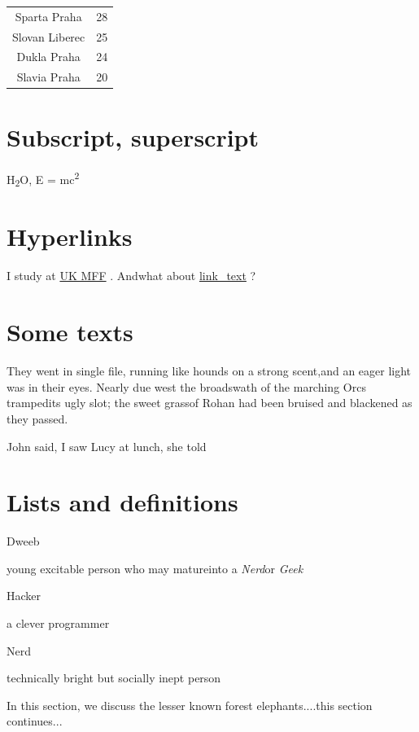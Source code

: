 \documentclass{article}
\begin{document}
\newline

\begin{tabular}{ cc }

 Sparta Praha & 28 \\ 

 Slovan Liberec & 25 \\ 

 Dukla Praha & 24 \\ 

 Slavia Praha & 20 \\ 



\end{tabular}

\section{Subscript, superscript}
\par H\textsubscript{2}O, E = mc\textsuperscript{2}
\section{Hyperlinks}
\par I study at 
\href{http://www.mff.cuni.cz}{UK MFF} . Andwhat about 
\hyperref[img]{link_text} ?
\section{Some texts}
\par 
\begin{center}They went in single file, running like hounds on a strong scent,and an eager light was in their eyes. Nearly due west the broadswath of the marching 
\small{Orcs tramped}its ugly slot; the sweet grassof Rohan had been bruised and blackened as they passed.
\end{center}
\par John said, I saw Lucy at lunch, she told
\section{Lists and definitions}
\begin{description}
\item Dweeb
\item \hspace{0.5cm}young excitable person who may matureinto a 
\emph{Nerd}or 
\emph{Geek}
\item Hacker
\item \hspace{0.5cm}a clever programmer
\item Nerd
\item \hspace{0.5cm}technically bright but socially inept person
\end{description}
\par In this section, we discuss the lesser known forest elephants....this section continues...
\end{document}
